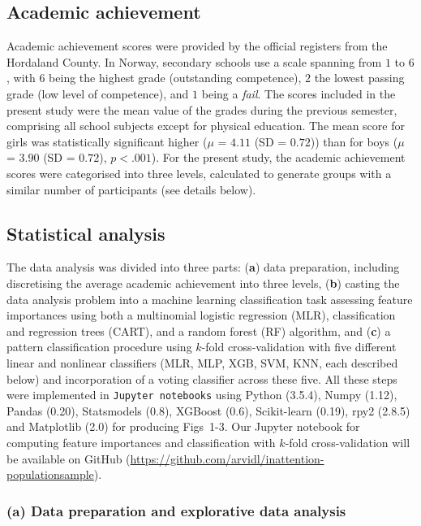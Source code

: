 \documentclass[10pt,letterpaper]{article}
\begin{document}
\subsection*{Academic achievement}
Academic achievement scores were provided by the official registers from the Hordaland County. In Norway, secondary schools use a scale spanning from $1$ to $6$, with $6$ 
being the highest grade (outstanding competence),  $2$  the lowest passing grade (low level of competence), and $1$ being a {\it fail}. 
The scores included in the present study were the mean value of the grades during the previous semester, comprising all school subjects except for physical education. 
The mean score for girls was statistically significant higher  ($\mu$ = $4.11$ (SD = $0.72$)) than for boys {($\mu$ = $3.90$ (SD = $0.72$)}, $p  <  .001$). 
For the present study, the academic achievement scores were categorised into three levels, calculated to generate groups with a similar number of participants (see details below). 



\subsection*{Statistical analysis}
The data analysis was divided into three parts: ({\bf  a}) data preparation, including discretising the average academic achievement into three levels,  ({\bf b}) casting the data analysis problem 
into a machine learning classification task assessing feature importances using both 
a multinomial logistic regression (MLR), classification and regression trees (CART), and a random forest (RF) algorithm, and ({\bf c}) a pattern 
classification procedure using $k$-fold cross-validation with five different linear and nonlinear classifiers (MLR, MLP, XGB, SVM, KNN, each described below) and incorporation of
a voting classifier across  these five.
All these steps were implemented in {\tt Jupyter notebooks}  using Python (3.5.4), Numpy (1.12), Pandas (0.20), Statsmodels (0.8),  XGBoost (0.6), Scikit-learn (0.19),  rpy2 (2.8.5)
and Matplotlib (2.0) for producing Figs~1-3. Our Jupyter notebook for computing feature importances and 
classification with $k$-fold cross-validation will be available on GitHub ({\small \url{https://github.com/arvidl/inattention-populationsample}}).  

\vspace{3mm}
\subsubsection*{(a) Data preparation and explorative data analysis}
\end{document}
